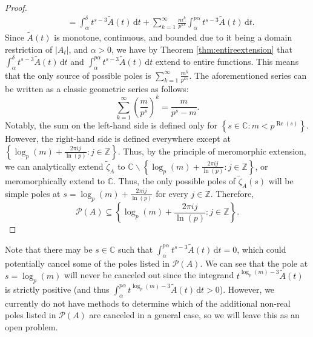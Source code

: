 \documentclass{article}
\theoremstyle{plain}
\numberwithin{equation}{section}
\numberwithin{table}{section}
\numberwithin{figure}{section}
\DeclareMathOperator{\re}{Re}
\newcommand{\vaddspace}[1]{\rule{0pt}{#1pt}}
\newcommand{\newparagraph}{\vaddspace{10}}
\begin{document}
\begin{proof}
\begin{align}
&= \int_{\alpha}^{\delta} t^{s-3} \tilde{A}(t) \,\mathrm{d}t + \sum_{k=1}^{\infty} \frac{m^k}{p^{k s}} \int_{\alpha}^{p\alpha} t^{s-3} \tilde{A}(t) \,\mathrm{d}t.
\end{align}
Since $\tilde{A}(t)$ is monotone, continuous, and bounded due to it being a domain restriction of $|A_t|$, and $\alpha > 0$, we have by Theorem \ref{thm:entireextension} that $\displaystyle \int_{\alpha}^{\delta} t^{s-3} \tilde{A}(t) \,\mathrm{d}t$ and $\displaystyle \int_{\alpha}^{p\alpha} t^{s-3} \tilde{A}(t) \,\mathrm{d}t$ extend to entire functions. This means that the only source of possible poles is $\displaystyle\sum_{k=1}^{\infty} \frac{m^k}{p^{k s}}$. The aforementioned series can be written as a classic geometric series as follows:
\begin{equation}
\sum_{k=1}^{\infty} \left(\frac{m}{p^{s}}\right)^k = \frac{m}{p^s-m}.
\end{equation}
Notably, the sum on the left-hand side is defined only for $\left\{s \in \mathbb{C} : m < p^{\re(s)}\right\}$. However, the right-hand side is defined everywhere except at $\left\{\log_p(m) + \frac{2\pi i j}{\ln(p)} : j \in \mathbb{Z}\right\}$. Thus, by the principle of meromorphic extension, we can analytically extend $\tilde{\zeta}_A$ to $\mathbb{C} \backslash \left\{\log_p(m) + \frac{2\pi i j}{\ln(p)} : j \in \mathbb{Z}\right\}$, or meromorphically extend to $\mathbb{C}$. Thus, the only possible poles of $\tilde{\zeta}_A(s)$ will be simple poles at $s = \log_p(m) + \frac{2\pi i j}{\ln(p)}$ for every $j \in \mathbb{Z}$. Therefore,
\begin{equation}
\mathscr{P}(A) \subseteq \left\{\log_p(m) + \frac{2\pi i j}{\ln(p)}: j \in \mathbb{Z}\right\}.
\end{equation}
\end{proof}
\newparagraph

Note that there may be $s \in \mathbb{C}$ such that $\displaystyle \int_{\alpha}^{p\alpha} t^{s-3} \tilde{A}(t) \,\mathrm{d}t = 0$, which could potentially cancel some of the poles listed in $\mathscr{P}(A)$. We can see that the pole at $s = \log_p(m)$ will never be canceled out since the integrand $t^{\log_p(m)-3} \tilde{A}(t)$ is strictly positive (and thus $\displaystyle \int_{\alpha}^{p\alpha} t^{\log_p(m)-3} \tilde{A}(t) \,\mathrm{d}t > 0$). However, we currently do not have methods to determine which of the additional non-real poles listed in $\mathscr{P}(A)$ are canceled in a general case, so we will leave this as an open problem.
\newparagraph
\end{document}
